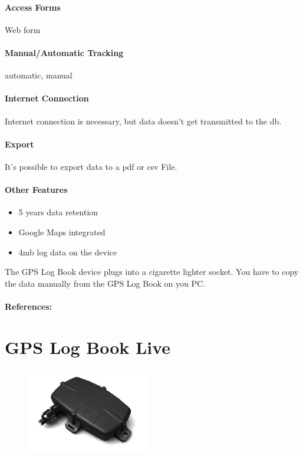 \paragraph{Access Forms} Web form
\paragraph{Manual/Automatic Tracking}automatic, manual
\paragraph{Internet Connection}Internet connection is necessary, but data doesn't get transmitted to the \gls{db}.
\paragraph{Export}It's possible to export data to a \gls{pdf} or \gls{csv} File.
\paragraph{Other Features}
\begin{itemize}
\item 5 years data retention 
\item Google Maps integrated
\item 4\gls{mb} log data on the device
\end{itemize}
The GPS Log Book device plugs into a cigarette lighter socket. You have to copy the data manually from the GPS Log Book on you PC.
\paragraph{References:} \cite{GPS_Log_Book}
\newpage

\section{GPS Log Book Live}
\begin{figure}
  \begin{center}
    \includegraphics[width=0.48\textwidth]{bilder/GPSlogbooklive!}
  \end{center}
\end{figure}
